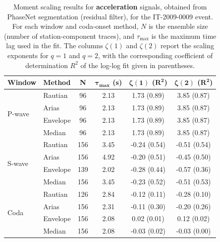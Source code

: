 \begin{table}[H]
\centering
\small
\begin{tabular}{llcccc}
\toprule
\textbf{Window} & \textbf{Method} & \textbf{N} & $\bm{\tau_{\max}}$ \textbf{(s)} & $\bm{\zeta(1)}$ \textbf{(}$\bm{R^2}$\textbf{)} & $\bm{\zeta(2)}$ \textbf{(}$\bm{R^2}$\textbf{)} \\
\midrule
\multirow{4}{*}{P-wave}
& Rautian & 96 & 2.13 & 1.73 (0.89) & 3.85 (0.87) \\
& Arias & 96 & 2.13 & 1.73 (0.89) & 3.85 (0.87) \\
& Envelope & 96 & 2.13 & 1.73 (0.89) & 3.85 (0.87) \\
& Median & 96 & 2.13 & 1.73 (0.89) & 3.85 (0.87) \\
\midrule
\multirow{4}{*}{S-wave}
& Rautian & 156 & 3.45 & -0.24 (0.54) & -0.51 (0.54) \\
& Arias & 156 & 4.92 & -0.20 (0.51) & -0.45 (0.50) \\
& Envelope & 139 & 2.02 & -0.28 (0.44) & -0.57 (0.36) \\
& Median & 156 & 3.45 & -0.23 (0.52) & -0.51 (0.53) \\
\midrule
\multirow{4}{*}{Coda}
& Rautian & 126 & 2.84 & -0.12 (0.11) & -0.28 (0.10) \\
& Arias & 156 & 2.31 & -0.11 (0.30) & -0.20 (0.26) \\
& Envelope & 156 & 2.08 & 0.02 (0.01) & 0.12 (0.02) \\
& Median & 156 & 2.08 & -0.03 (0.02) & -0.03 (0.00) \\
\bottomrule
\end{tabular}
\caption{Moment scaling results for \textbf{acceleration} signals, obtained from PhaseNet segmentation (residual filter), for the IT-2009-0009 event. For each window and coda-onset method, $N$ is the ensemble size (number of station-component traces), and $\tau_{\max}$ is the maximum time lag used in the fit. The columns $\zeta(1)$ and $\zeta(2)$ report the scaling exponents for $q=1$ and $q=2$, with the corresponding coefficient of determination $R^2$ of the log-log fit given in parentheses.}
\label{tab:phasenet_scaling_acc_res_filter_laquila}
\end{table}